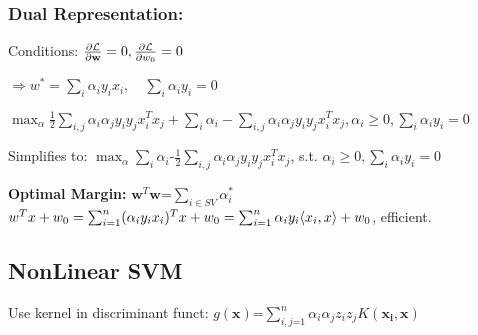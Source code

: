 \subsubsection{Dual Representation: }
Conditions: 
	$\frac{\partial\mathcal L}{\partial \mathbf w} = 0,
	\frac{\partial\mathcal L}{\partial w_0} = 0 $
	
	$\Rightarrow w^* = \sum_i\alpha_i y_i x_i, \quad \sum_i \alpha_i y_i = 0 $
	
\vspace{0.1em}
	$\max_\alpha \frac{1}{2}\sum_{i,j} \alpha_i\alpha_jy_iy_jx_i^Tx_j + \sum_i \alpha_i - \sum_{i,j} \alpha_i\alpha_jy_iy_jx_i^Tx_j, \alpha_i\geq 0, \sum_i\alpha_i y_i = 0$

Simplifies to: $\max_\alpha \sum_i \alpha_i\text{-}\frac{1}{2}\sum_{i,j} \alpha_i\alpha_jy_iy_jx_i^Tx_j$, s.t.
$\alpha_i\geq 0, \sum_i\alpha_i y_i = 0$

\textbf{Optimal Margin:} $\mathbf{w}^T\mathbf{w}\text{=}\sum_{i\in SV}\alpha_i^*$\\
\sepline
${w}^T x + w_0 = \sum_{i = 1}^{n} (\alpha_iy_ix_i)^Tx + w_0 = \sum_{i = 1}^{n} \alpha_i y_i \langle x_i, x \rangle + w_0$, efficient.


\subsection*{Non\-Linear SVM}
Use kernel in discriminant funct: $g(\mathbf{x})\text{=}\sum_{i,j\text{=}1}^n\alpha_i\alpha_jz_iz_jK(\mathbf{x_i},\mathbf{x})$\\

